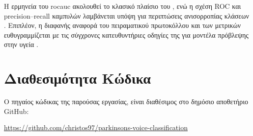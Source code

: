 Η ερμηνεία του \gls{rocauc} ακολουθεί το κλασικό πλαίσιο του \citet{fawcett2006roc}, 
ενώ η σχέση ROC και precision--recall καμπυλών λαμβάνεται υπόψη για περιπτώσεις ανισορροπίας κλάσεων \citep{davis2006pr_roc}. 
Επιπλέον, η διαφανής αναφορά του πειραματικού πρωτοκόλλου και των μετρικών ευθυγραμμίζεται με τις σύγχρονες κατευθυντήριες οδηγίες της  για μοντέλα πρόβλεψης στην υγεία \citep{collins2024tripod}.

\section*{Διαθεσιμότητα Κώδικα}

Ο πηγαίος κώδικας της παρούσας εργασίας, είναι διαθέσιμος στο δημόσιο αποθετήριο GitHub:

\begin{center}
  \url{https://github.com/christos97/parkinsons-voice-classification}
\end{center}
